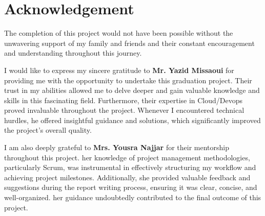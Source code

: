 \chapter*{\Huge Acknowledgement}

\begingroup
\large \raggedright The completion of this project would not have been possible without the unwavering support of my family and friends and
their constant encouragement and understanding throughout this journey.

\vspace{4mm}
I would like to express my sincere gratitude to \textbf{Mr. Yazid Missaoui} for providing me with the opportunity to undertake this graduation project. Their trust in my abilities allowed me to delve deeper and gain valuable knowledge and skills in this fascinating field. Furthermore, their expertise in Cloud/Devops proved invaluable throughout the project. Whenever I encountered technical hurdles, he offered insightful guidance and solutions, which significantly improved the project's overall quality.

\vspace{4mm}
I am also deeply grateful to \textbf{Mrs. Yousra Najjar} for their mentorship throughout this project. her knowledge of project management methodologies, particularly Scrum, was instrumental in effectively structuring my workflow and achieving project milestones.  Additionally, she provided valuable feedback and suggestions during the report writing process, ensuring it was clear, concise, and well-organized. her guidance undoubtedly contributed to the final outcome of this project.
\endgroup

\vspace{8mm}
\begin{flushright}
    \LARGE \@author
\end{flushright}